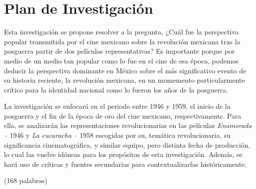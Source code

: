 \section{Plan de Investigación}
Esta investigación se propone resolver a la pregunta,
¿Cuál fue la perspectiva popular transmitida por el cine mexicano sobre la revolución mexicana tras la posguerra partir de dos películas representativas? Es importante porque por medio de un medio tan popular como lo fue en el cine de esa época, podemos deducir la perspectiva dominante en México sobre el más significativo evento de su historia reciente, la revolución mexicana, en un momemento particularmente crítico para la identidad nacional como lo fueron los años de la posguerra.

La investigación se enfocará en el periodo entre 1946 y 1959, el inicio de la posguerra y el fin de la época de oro del cine mexicano, respectivamente. Para ella, se analizarán las representaciones revolucionarias en las películas \textit{Enamorada} -- 1946 y \textit{La cucaracha} -- 1958 escogidas por su, temática revolucionaria, su significancia cinematográfica, y similar equipo, pero distinta fecha de producción, lo cual las vuelve idóneas para los propósitos de esta investigación. Además, se hará uso de críticas y fuentes secundarias para contextualizarlas históricamente.

(168 palabras)
